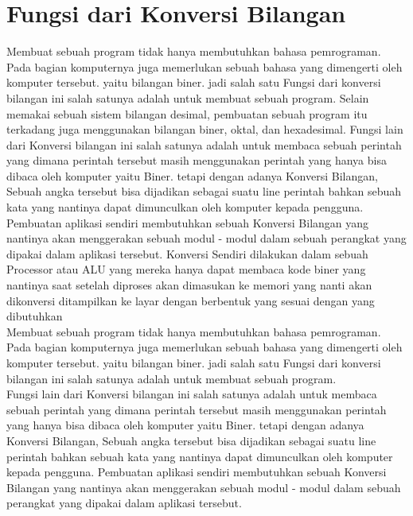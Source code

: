 \section{Fungsi dari Konversi Bilangan}
Membuat sebuah program tidak hanya membutuhkan bahasa pemrograman. Pada bagian komputernya juga memerlukan sebuah bahasa yang dimengerti oleh komputer tersebut. yaitu bilangan biner. jadi salah satu Fungsi dari konversi bilangan ini salah satunya adalah untuk membuat sebuah program. Selain memakai sebuah sistem bilangan desimal, pembuatan sebuah program itu terkadang juga menggunakan bilangan biner, oktal, dan hexadesimal.
Fungsi lain dari Konversi bilangan ini salah satunya adalah untuk membaca sebuah perintah yang dimana perintah tersebut masih menggunakan perintah yang hanya bisa dibaca oleh komputer yaitu Biner. tetapi dengan adanya Konversi Bilangan, Sebuah angka tersebut bisa dijadikan sebagai suatu line perintah bahkan sebuah kata yang nantinya dapat dimunculkan oleh komputer kepada pengguna. Pembuatan aplikasi sendiri membutuhkan sebuah Konversi Bilangan yang nantinya akan menggerakan sebuah modul - modul dalam sebuah perangkat yang dipakai dalam aplikasi tersebut. 
Konversi Sendiri dilakukan dalam sebuah Processor atau ALU yang mereka hanya dapat membaca kode biner yang nantinya saat setelah diproses akan dimasukan ke memori yang nanti akan dikonversi ditampilkan ke layar dengan berbentuk yang sesuai dengan yang dibutuhkan \cite{noersasongko1996mengrnal}
\\Membuat sebuah program tidak hanya membutuhkan bahasa pemrograman. Pada bagian komputernya juga memerlukan sebuah bahasa yang dimengerti oleh komputer tersebut. yaitu bilangan biner. jadi salah satu Fungsi dari konversi bilangan ini salah satunya adalah untuk membuat sebuah program. 
\\Fungsi lain dari Konversi bilangan ini salah satunya adalah untuk membaca sebuah perintah yang dimana perintah tersebut masih menggunakan perintah yang hanya bisa dibaca oleh komputer yaitu Biner. tetapi dengan adanya Konversi Bilangan, Sebuah angka tersebut bisa dijadikan sebagai suatu line perintah bahkan sebuah kata yang nantinya dapat dimunculkan oleh komputer kepada pengguna. Pembuatan aplikasi sendiri membutuhkan sebuah Konversi Bilangan yang nantinya akan menggerakan sebuah modul - modul dalam sebuah perangkat yang dipakai dalam aplikasi tersebut. 

